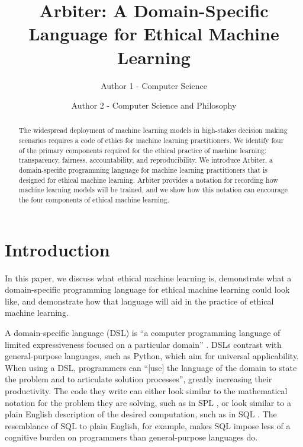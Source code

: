 \documentclass[letterpaper]{article}
\title{Arbiter: A Domain-Specific Language for Ethical Machine Learning}
\author{Author 1 - Computer Science \and Author 2 - Computer Science and Philosophy }
\newcommand{\citep}[1]{\cite{#1}}
\begin{document}
\maketitle
\begin{abstract}
The widespread deployment of machine learning models in high-stakes decision making scenarios requires a code of ethics for machine learning practitioners. We identify four of the primary components required for the ethical practice of machine learning: transparency, fairness, accountability, and reproducibility. We introduce Arbiter, a domain-specific programming language for machine learning practitioners that is designed for ethical machine learning. Arbiter provides a notation for recording how machine learning models will be trained, and we show how this notation can encourage the four components of ethical machine learning.
\end{abstract}


\section{Introduction}
In this paper, we discuss what ethical machine learning is, demonstrate what a domain-specific programming language for ethical machine learning could look like, and demonstrate how that language will aid in the practice of ethical machine learning.

A domain-specific language (DSL) is ``a computer programming language of limited expressiveness focused on a particular domain'' \citep{Fowler2010}. DSLs contrast with general-purpose languages, such as Python, which aim for universal applicability. When using a DSL, programmers can ``[use] the language of the domain to state the problem and to articulate solution processes''\citep{Felleisen2015}, greatly increasing their productivity. The code they write can either look similar to the mathematical notation for the problem they are solving, such as in SPL \citep{Werk2012}, or look similar to a plain English description of the desired computation, such as in SQL \citep{Date1997}. The resemblance of SQL to plain English, for example, makes SQL impose less of a cognitive burden on programmers than general-purpose languages do.
\end{document}

